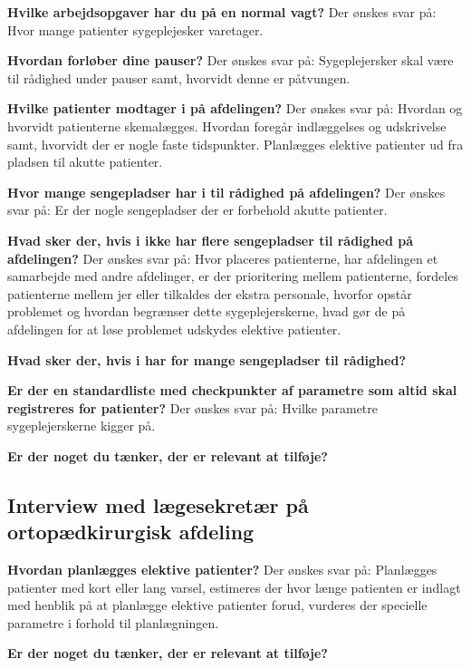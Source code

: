 \textbf{Hvilke arbejdsopgaver har du på en normal vagt?}
Der ønskes svar på: Hvor mange patienter sygeplejesker varetager. 

\textbf{Hvordan forløber dine pauser?}
Der ønskes svar på: Sygeplejersker skal være til rådighed under pauser samt, hvorvidt denne er påtvungen. 

\textbf{Hvilke patienter modtager i på afdelingen?}
Der ønskes svar på: Hvordan og hvorvidt patienterne skemalægges. Hvordan foregår indlæggelses og udskrivelse samt, hvorvidt der er nogle faste tidspunkter. Planlægges elektive patienter ud fra pladsen til akutte patienter.  

\textbf{Hvor mange sengepladser har i til rådighed på afdelingen?} 
Der ønskes svar på: Er der nogle sengepladser der er forbehold akutte patienter.


\textbf{Hvad sker der, hvis i ikke har flere sengepladser til rådighed på afdelingen?}
Der ønskes svar på: Hvor placeres patienterne, har afdelingen et samarbejde med andre afdelinger, er der prioritering mellem patienterne, fordeles patienterne mellem jer eller tilkaldes der ekstra personale, hvorfor opstår problemet og hvordan begrænser dette sygeplejerskerne, hvad gør de på afdelingen for at løse problemet udskydes elektive patienter. 

\textbf{Hvad sker der, hvis i har for mange sengepladser til rådighed?}

\textbf{Er der en standardliste med checkpunkter af parametre som altid skal registreres for patienter?}
Der ønskes svar på: Hvilke parametre sygeplejerskerne kigger på. 

\textbf{Er der noget du tænker, der er relevant at tilføje? }

\subsection{Interview med lægesekretær på ortopædkirurgisk afdeling}
\textbf{Hvordan planlægges elektive patienter?}
Der ønskes svar på: Planlægges patienter med kort eller lang varsel, estimeres der hvor længe patienten er indlagt med henblik på at planlægge elektive patienter forud, vurderes der specielle parametre i forhold til planlægningen. 

\textbf{Er der noget du tænker, der er relevant at tilføje?}




